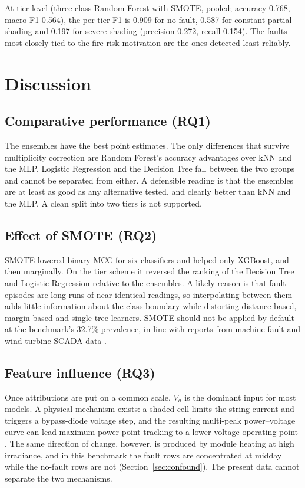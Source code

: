 \documentclass[11pt,a4paper]{article}
\begin{document}
At tier level (three-class Random Forest with SMOTE, pooled; accuracy 0.768, macro-F1 0.564), the per-tier F1 is 0.909 for no fault, 0.587 for constant partial shading and 0.197 for severe shading (precision 0.272, recall 0.154). The faults most closely tied to the fire-risk motivation are the ones detected least reliably.

\section{Discussion}

\subsection{Comparative performance (RQ1)}

The ensembles have the best point estimates. The only differences that survive multiplicity correction are Random Forest's accuracy advantages over kNN and the MLP. Logistic Regression and the Decision Tree fall between the two groups and cannot be separated from either. A defensible reading is that the ensembles are at least as good as any alternative tested, and clearly better than kNN and the MLP. A clean split into two tiers is not supported.

\subsection{Effect of SMOTE (RQ2)}

SMOTE lowered binary MCC for six classifiers and helped only XGBoost, and then marginally. On the tier scheme it reversed the ranking of the Decision Tree and Logistic Regression relative to the ensembles. A likely reason is that fault episodes are long runs of near-identical readings, so interpolating between them adds little information about the class boundary while distorting distance-based, margin-based and single-tree learners. SMOTE should not be applied by default at the benchmark's 32.7\% prevalence, in line with reports from machine-fault and wind-turbine SCADA data \citep{Swana2022,MaldonadoCorrea2024}.

\subsection{Feature influence (RQ3)}

Once attributions are put on a common scale, $V_a$ is the dominant input for most models. A physical mechanism exists: a shaded cell limits the string current and triggers a bypass-diode voltage step, and the resulting multi-peak power--voltage curve can lead maximum power point tracking to a lower-voltage operating point \citep{Kappler2024}. The same direction of change, however, is produced by module heating at high irradiance, and in this benchmark the fault rows are concentrated at midday while the no-fault rows are not (Section~\ref{sec:confound}). The present data cannot separate the two mechanisms.
\end{document}
